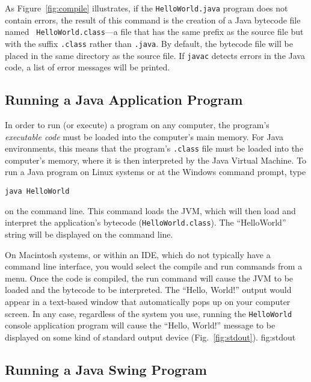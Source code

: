\noindent As Figure~\ref{fig:compile} illustrates, if the 
{\tt HelloWorld.java} program does not contain errors, the result of
this command is the creation of a Java bytecode file named {\tt
HelloWorld.class}---a file that has the same prefix as the source file
but with the suffix {\tt .class} rather than {\tt .java}.  By default,
the bytecode file will be placed in the same directory as the source
file. If {\tt javac} detects errors in the Java code, a list of error
messages will be printed.

\subsection{Running a Java Application Program}

\noindent In order to run (or execute) a program on any computer, 
the program's {\it executable code} must be loaded into the
computer's main memory.  For Java environments, this means that the
program's {\tt .class} file must be loaded into the computer's memory,
where it is then interpreted by the Java Virtual Machine.  To run a
Java program on Linux systems or at the Windows command prompt, type

\begin{jjjlisting}
\begin{lstlisting}
java HelloWorld
\end{lstlisting}
\end{jjjlisting}

\noindent on the command line.  This command loads the JVM,
which will then load and interpret the application's bytecode
({\tt HelloWorld.class}). The ``HelloWorld'' string will be displayed on
the command line.

On Macintosh systems, or within an IDE, which do not typically 
have a command line interface, you would select the compile and run
commands from a menu.  Once the code is compiled, the run command will
cause the JVM to be loaded and the bytecode to be interpreted.  The
``Hello, World!''  output would appear in a text-based window that
automatically pops up on your computer screen.  In any case,
regardless of the system you use, running the {\tt HelloWorld}
console application program will cause the ``Hello, World!'' message to be
displayed on some kind of standard output device (Fig.~\ref{fig:stdout}).
{fig:stdout}


\subsection{Running a Java Swing Program}
\label{subsec:swing}

